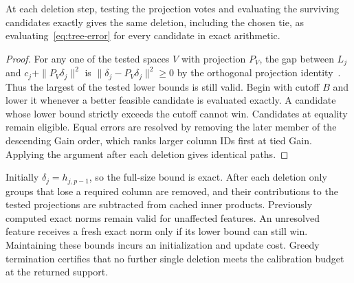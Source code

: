 \begin{proposition}
At each deletion step, testing the projection votes and evaluating the surviving
candidates exactly gives the same deletion, including the chosen tie, as
evaluating~\eqref{eq:tree-error} for every candidate in exact arithmetic.
\end{proposition}
\begin{proof}
For any one of the tested spaces $V$ with projection $P_V$, the gap between
$L_j$ and $c_j+\|P_V\delta_j\|^2$ is $\|\delta_j-P_V\delta_j\|^2\ge0$
by the orthogonal projection identity~\citep{melrose2013bessel}. Thus the
largest of the tested lower bounds is still valid. Begin with cutoff $B$ and lower it
whenever a better feasible candidate is evaluated exactly. A candidate whose
lower bound strictly exceeds the cutoff cannot win. Candidates at equality remain
eligible. Equal errors are resolved by removing the later member of the
descending Gain order, which ranks larger column IDs first at tied Gain.
Applying the argument after each deletion gives identical paths.
\end{proof}

Initially $\delta_j=h_{j,p-1}$, so the full-size bound is exact. After each deletion only groups
that lose a required column are removed, and their contributions to
the tested projections are subtracted from cached inner products.
Previously computed exact norms remain valid for unaffected features. An
unresolved feature receives a fresh exact norm only if its lower bound can
still win. Maintaining these bounds incurs an initialization and update cost.
Greedy termination certifies that no further
single deletion meets the calibration budget at the returned support.
